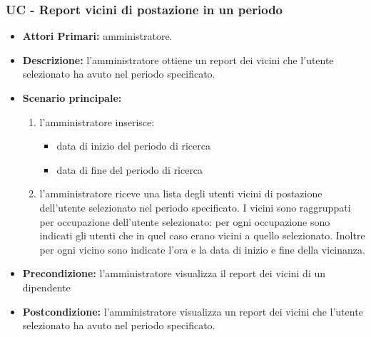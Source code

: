 \subsubsection{ UC - Report vicini di postazione in un periodo}
\begin{itemize}
	\item\textbf{Attori Primari:} 
	amministratore.
	\item\textbf{Descrizione:} 
	l'amministratore ottiene un report dei vicini che l'utente selezionato ha avuto nel periodo specificato.
	\item\textbf{Scenario principale:} 
	\begin{enumerate}
		\item l'amministratore inserisce:
		\begin{itemize}
			\item data di inizio del periodo di ricerca
			\item data di fine del periodo di ricerca
		\end{itemize}
		\item l'amministratore riceve una lista degli utenti vicini di postazione dell'utente selezionato nel periodo specificato. I vicini sono raggruppati per occupazione dell'utente selezionato: per ogni occupazione sono indicati gli utenti che in quel caso erano vicini a quello selezionato. Inoltre per ogni vicino sono indicate l'ora e la data di inizio e fine della vicinanza.
	\end{enumerate}
	\item\textbf{Precondizione:} 
	l'amministratore visualizza il report dei vicini di un dipendente
	\item\textbf{Postcondizione:}
	l'amministratore visualizza un report dei vicini che l'utente selezionato ha avuto nel periodo specificato.
\end{itemize}


